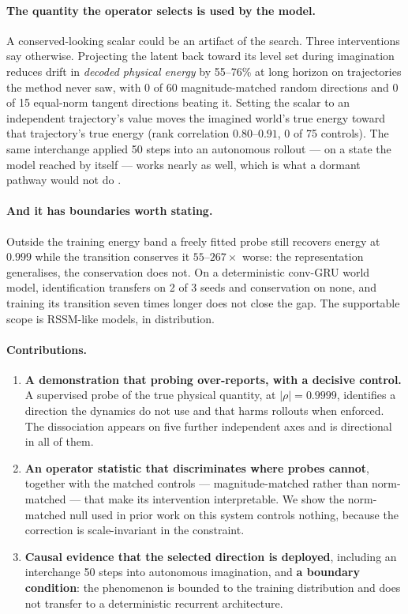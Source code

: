 \paragraph{The quantity the operator selects is used by the model.}
A conserved-looking scalar could be an artifact of the search. Three interventions say otherwise.
Projecting the latent back toward its level set during imagination reduces drift in \emph{decoded
physical energy} by 55--76\% at long horizon on trajectories the method never saw, with 0 of 60
magnitude-matched random directions and 0 of 15 equal-norm tangent directions beating it. Setting the
scalar to an independent trajectory's value moves the imagined world's true energy toward that
trajectory's true energy (rank correlation $0.80$--$0.91$, 0 of 75 controls). The same interchange
applied 50 steps into an autonomous rollout --- on a state the model reached by itself --- works
nearly as well, which is what a dormant pathway would not do \citep{makelov2024illusion}.

\paragraph{And it has boundaries worth stating.}
Outside the training energy band a freely fitted probe still recovers energy at $0.999$ while the
transition conserves it $55$--$267\times$ worse: the representation generalises, the conservation does
not. On a deterministic conv-GRU world model, identification transfers on 2 of 3 seeds and
conservation on none, and training its transition seven times longer does not close the gap. The
supportable scope is RSSM-like models, in distribution.

\paragraph{Contributions.}
\begin{enumerate}
\item \textbf{A demonstration that probing over-reports, with a decisive control.} A supervised probe
of the true physical quantity, at $|\rho| = 0.9999$, identifies a direction the dynamics do not use
and that harms rollouts when enforced. The dissociation appears on five further independent axes and
is directional in all of them.
\item \textbf{An operator statistic that discriminates where probes cannot}, together with the
matched controls --- magnitude-matched rather than norm-matched --- that make its intervention
interpretable. We show the norm-matched null used in prior work on this system controls nothing,
because the correction is scale-invariant in the constraint.
\item \textbf{Causal evidence that the selected direction is deployed}, including an interchange 50
steps into autonomous imagination, and \textbf{a boundary condition}: the phenomenon is bounded to
the training distribution and does not transfer to a deterministic recurrent architecture.
\end{enumerate}
